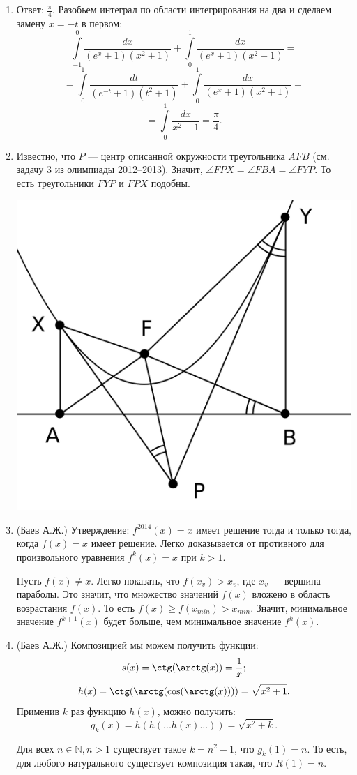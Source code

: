 \documentclass[11pt, a4paper]{article}
\begin{document}
\begin{enumerate}
\item Ответ: $\frac{\pi}{4}$. Разобьем интеграл по области интегрирования на два и сделаем замену $x = -t$ в первом:
$$\int\limits_{-1}^{0} \frac{dx}{(e^x + 1)(x^2 + 1)} + \int\limits_{0}^{1} \frac{dx}{(e^x + 1)(x^2 + 1)} = $$
$$= \int\limits_{0}^{1} \frac{dt}{(e^{-t}+ 1)(t^2 + 1)} + \int\limits_{0}^{1} \frac{dx}{(e^x + 1)(x^2 + 1)} = $$
$$= \int\limits_{0}^{1} \frac{dx}{x^2 + 1} = \frac{\pi}{4}.$$

\item Известно, что $P$ --- центр описанной окружности треугольника $AFB$ (см. задачу 3 из олимпиады 2012--2013). Значит, $\angle FPX = \angle FBA = \angle FYP$. То есть треугольники $FYP$  и $FPX$ подобны.
\begin{center}
\includegraphics[width=0.5\linewidth]{pictures/2013-2014-bonus-6}
\end{center}

\item (Баев А.Ж.) Утверждение: $f^{2014}(x) = x$ имеет решение тогда и только тогда, когда $f(x) = x$ имеет решение. Легко доказывается от противного для произвольного уравнения $f^k(x) = x$ при $k>1$.

Пусть $f(x) \neq x$. Легко показать, что $f(x_v) > x_v$, где $x_v$ --- вершина параболы. Это значит, что множество значений $f(x)$ вложено в область возрастания $f(x)$. То есть $f(x) \geqslant f(x_{min}) > x_{min}$. Значит, минимальное значение $f^{k+1}(x)$ будет больше, чем минимальное значение $f^{k}(x)$.

\item (Баев А.Ж.) Композицией мы можем получить функции:
$$s(x) = \ctg (\arctg (x) ) = \frac{1}{x};$$
$$h(x) = \ctg (\arctg ( \cos ( \arctg(x) ) ) ) = \sqrt{x^2+1}.$$
Применив $k$ раз функцию $h(x)$, можно получить:
$$g_k(x) = h(h( ... h(x) ... )) = \sqrt{x^2 + k}.$$

Для всех $n \in \mathbb{N}, n > 1$ существует такое $k = n^2-1$, что $g_k(1) = n$. То есть, для любого натурального существует композиция такая, что  $R(1) = n$.


\end{enumerate}
\end{document}
